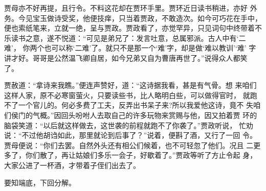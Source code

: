 贾母亦不好再提，且行令。不料这花却在贾环手里。贾环近日读书稍进，亦好
外务。今见宝玉做诗受奖，他便技痒，只当着贾政，不敢造次。如今可巧花在手中，
便也索纸笔来，立就一绝，呈与贾政。贾政看了，亦觉罕异，只见词句中终带着不
乐读书之意，遂不悦道：“可见是弟兄了：发言吐意，总属邪派。古人中有‘二难’，
你两个也可以称‘二难’了。就只不是那一个‘难’字，却是做‘难以教训’‘难’
字讲才好。哥哥是公然温飞卿自居，如今兄弟又自为曹唐再世了。”说得众人都笑
了。

贾赦道：“拿诗来我瞧。”便连声赞好，道：“这诗据我看，甚是有气骨。想
来咱们这样人家，原不必寒窗萤火，只要读些书，比人略明白些，可以做得官时，
就跑不了一个官儿的。何必多费了工夫，反弄出书呆子来?所以我爱他这诗，竟不
失咱们侯门的气概。”因回头吩咐人去取自己的许多玩物来赏赐与他，因又拍着贾
环的脑袋笑道：“以后就这样做去，这世袭的前程就跑不了你袭了。”贾政听说，
忙劝说：“不过他胡诌如此，那里就论到后事了？”说着，便斟了酒，又行了一回
令。贾母便说：“你们去罢。自然外头还有相公们候着，也不可轻忽了他们。况且
二更多了，你们散了，再让姑娘们多乐一会子，好歇着了。”贾政等听了方止令起
身，大家公进了一杯酒，才带着子侄们出去了。

要知端底，下回分解。